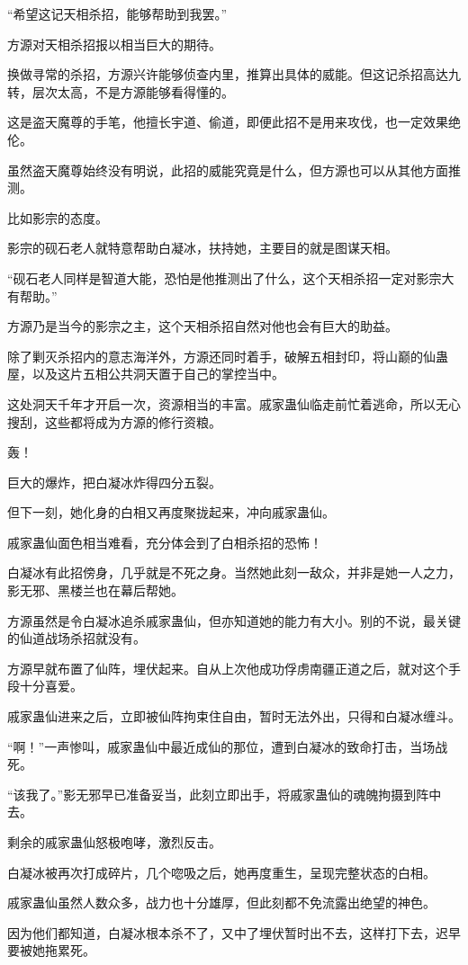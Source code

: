 \begin{this_body}
“希望这记天相杀招，能够帮助到我罢。”

方源对天相杀招报以相当巨大的期待。

换做寻常的杀招，方源兴许能够侦查内里，推算出具体的威能。但这记杀招高达九转，层次太高，不是方源能够看得懂的。

这是盗天魔尊的手笔，他擅长宇道、偷道，即便此招不是用来攻伐，也一定效果绝伦。

虽然盗天魔尊始终没有明说，此招的威能究竟是什么，但方源也可以从其他方面推测。

比如影宗的态度。

影宗的砚石老人就特意帮助白凝冰，扶持她，主要目的就是图谋天相。

“砚石老人同样是智道大能，恐怕是他推测出了什么，这个天相杀招一定对影宗大有帮助。”

方源乃是当今的影宗之主，这个天相杀招自然对他也会有巨大的助益。

除了剿灭杀招内的意志海洋外，方源还同时着手，破解五相封印，将山巅的仙蛊屋，以及这片五相公共洞天置于自己的掌控当中。

这处洞天千年才开启一次，资源相当的丰富。戚家蛊仙临走前忙着逃命，所以无心搜刮，这些都将成为方源的修行资粮。

轰！

巨大的爆炸，把白凝冰炸得四分五裂。

但下一刻，她化身的白相又再度聚拢起来，冲向戚家蛊仙。

戚家蛊仙面色相当难看，充分体会到了白相杀招的恐怖！

白凝冰有此招傍身，几乎就是不死之身。当然她此刻一敌众，并非是她一人之力，影无邪、黑楼兰也在幕后帮她。

方源虽然是令白凝冰追杀戚家蛊仙，但亦知道她的能力有大小。别的不说，最关键的仙道战场杀招就没有。

方源早就布置了仙阵，埋伏起来。自从上次他成功俘虏南疆正道之后，就对这个手段十分喜爱。

戚家蛊仙进来之后，立即被仙阵拘束住自由，暂时无法外出，只得和白凝冰缠斗。

“啊！”一声惨叫，戚家蛊仙中最近成仙的那位，遭到白凝冰的致命打击，当场战死。

“该我了。”影无邪早已准备妥当，此刻立即出手，将戚家蛊仙的魂魄拘摄到阵中去。

剩余的戚家蛊仙怒极咆哮，激烈反击。

白凝冰被再次打成碎片，几个唿吸之后，她再度重生，呈现完整状态的白相。

戚家蛊仙虽然人数众多，战力也十分雄厚，但此刻都不免流露出绝望的神色。

因为他们都知道，白凝冰根本杀不了，又中了埋伏暂时出不去，这样打下去，迟早要被她拖累死。


\end{this_body}
